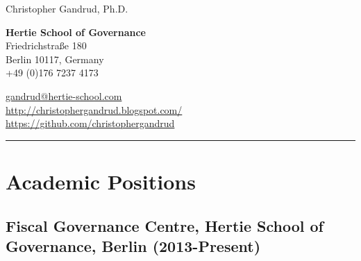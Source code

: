 \documentclass[a4paper]{article}
\begin{document}
\begin{flushright}
    {\huge{Christopher Gandrud, Ph.D.}} \\
    \vspace{0.25cm}

    {\bf{\large{Hertie School of Governance}}} \\
    Friedrichstra{\ss}e 180\\
    Berlin 10117, Germany \\
    +49 (0)176 7237 4173 \\
    \vspace{0.25cm}

    \href{mailto:gandrud@hertie-school.com}{gandrud@hertie-school.com}\\
    \url{http://christophergandrud.blogspot.com/} \\
    \url{https://github.com/christophergandrud}\\
    [0.25cm]
\end{flushright}
\medskip\hrule height 1pt
\vspace{1cm}

\section*{Academic Positions}

\subsection*{Fiscal Governance Centre, Hertie School of Governance, Berlin (2013-Present)}
\end{document}
